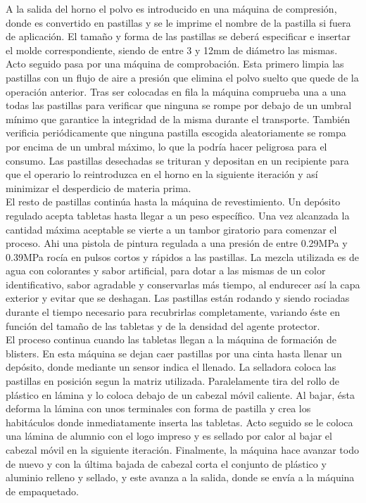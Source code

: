 A la salida del horno el polvo es introducido en una máquina de compresión, donde es convertido en pastillas y se le imprime el nombre de la pastilla si fuera de aplicación. El tamaño y forma de las pastillas se deberá especificar e insertar el molde correspondiente, siendo de entre 3 y 12mm de diámetro las mismas. \\  

Acto seguido pasa por una máquina de comprobación. Esta primero limpia las pastillas con un flujo de aire a presión que elimina el polvo suelto que quede de la operación anterior. Tras ser colocadas en fila la máquina comprueba una a una todas las pastillas para verificar que ninguna se rompe por debajo de un umbral mínimo que garantice la integridad de la misma durante el transporte. También verificia periódicamente que ninguna pastilla escogida aleatoriamente se rompa por encima de un umbral máximo, lo que la podría hacer peligrosa para el consumo. Las pastillas desechadas se trituran y depositan en un recipiente para que el operario lo reintroduzca en el horno en la siguiente iteración y así minimizar el desperdicio de materia prima. \\

El resto de pastillas continúa hasta la máquina de revestimiento. Un depósito regulado acepta tabletas hasta llegar a un peso específico. Una vez alcanzada la cantidad máxima aceptable se vierte a un tambor giratorio para comenzar el proceso. Ahi una pistola de pintura regulada a una presión de entre 0.29MPa y 0.39MPa rocía en pulsos cortos y rápidos a las pastillas. La mezcla utilizada es de agua con colorantes y sabor artificial, para dotar a las mismas de un color identificativo, sabor agradable y conservarlas más tiempo, al endurecer así la capa exterior y evitar que se deshagan. 
Las pastillas están rodando y siendo rociadas durante el tiempo necesario para recubrirlas completamente, variando éste en función del tamaño de las tabletas y de la densidad del agente protector.\\

El proceso continua cuando las tabletas llegan a la máquina de formación de blisters.
En esta máquina se dejan caer pastillas por una cinta hasta llenar un depósito, donde mediante un sensor indica el llenado. La selladora coloca las pastillas en posición segun la matriz utilizada. Paralelamente tira del rollo de plástico en lámina y lo coloca debajo de un cabezal móvil caliente. Al bajar, ésta deforma la lámina con unos terminales con forma de pastilla y crea los habitáculos donde inmediatamente inserta las tabletas. Acto seguido se le coloca una lámina de alumnio con el logo impreso y es sellado por calor al bajar el cabezal móvil en la siguiente iteración. Finalmente, la máquina hace avanzar todo de nuevo y con la última bajada de cabezal corta el conjunto de plástico y aluminio relleno y sellado, y este avanza a la salida, donde se  envía a la máquina de empaquetado.\\

